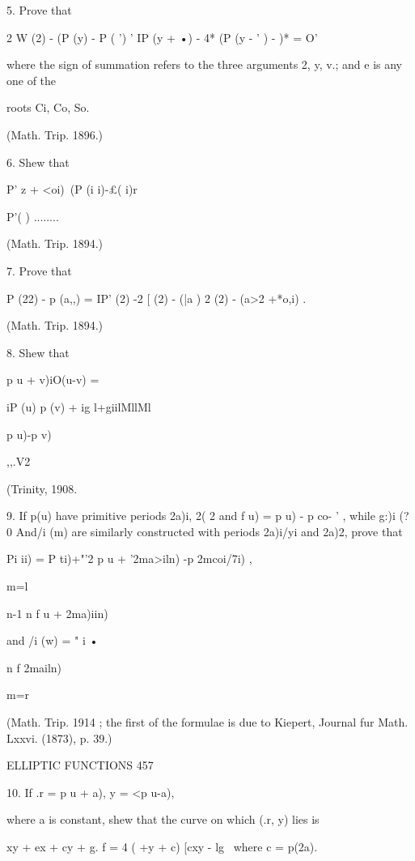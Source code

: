 {5. Prove that

2 W (2) - (P (y) - P ( ') ' IP (y + •) - 4* (P (y - ' ) - )* = O'

where the sign of summation refers to the three arguments 2, y, v.;
and e is any one of the

roots Ci, Co, So.

(Math. Trip. 1896.)

6. Shew that

P' z + <oi)\ (P (i i)-£( i)r






P'( ) ........

(Math. Trip. 1894.)

7. Prove that

P (22) - p (a,,) = IP' (2) -2 [ (2) - (|a ) 2 (2) - (a>2 +*o,i) .

(Math. Trip. 1894.)

8. Shew that



p u + v)iO(u-v) =



iP (u) p (v) + ig l+giilMllMl



 p u)-p v)



,,.V2



(Trinity, 1908.



9. If p(u) have primitive periods 2a)i, 2( 2 and f u) = p u) - p co- '
, while g:)i (?0 And/i (m) are similarly constructed with periods
2a)i/yi and 2a)2, prove that

Pi ii) = P ti)+"'2 p u + '2ma>iln) -p 2mcoi/7i) ,

m=l

n-1 n f u + 2ma)iin)

 and /i (w) = " i •

n f 2mailn)

m=r

(Math. Trip. 1914 ; the first of the formulae is due to Kiepert,
Journal fur Math. Lxxvi. (1873), p. 39.)



ELLIPTIC FUNCTIONS 457

10. If .r = p u + a), y = <p u-a),

where a is constant, shew that the curve on which (.r, y) lies is

 xy + ex + cy + g. f = 4 ( +y + c) [cxy - lg \ where c = p(2a).

}
